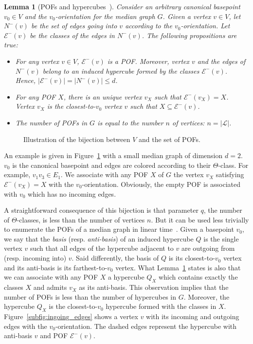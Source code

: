 \documentclass[11pt,letterpaper]{article}
\newtheorem{lemma}{Lemma}
\newcommand{\card}[1]{\left| #1 \right|}
\begin{document}
\begin{lemma}[POFs and hypercubes~\cite{BaChDrKo06,BaQuSaMa02,Ko09}]
Consider an arbitrary canonical basepoint $v_0 \in V$ and the $v_0$-orientation for the median graph $G$. Given a vertex $v \in V$, let $N^-(v)$ be the set of edges going into $v$ according to the $v_0$-orientation. Let $\mathcal{E}^-(v)$ be the classes of the edges in $N^-(v)$. The following propositions are true:
\begin{itemize}
\item For any vertex $v\in V$, $\mathcal{E}^-(v)$ is a POF. Moreover, vertex $v$ and the edges of $N^-(v)$ belong to an induced hypercube formed by the classes $\mathcal{E}^-(v)$. Hence, $\card{\mathcal{E}^-(v)} = \card{N^-(v)} \le d$.
\item For any POF $X$, there is an unique vertex $v_X$ such that $\mathcal{E}^-(v_X) = X$. Vertex $v_X$ is the closest-to-$v_0$ vertex $v$ such that $X \subseteq \mathcal{E}^-(v)$.
\item The number of POFs in $G$ is equal to the number $n$ of vertices: $n = \card{\mathcal{L}}$.
\end{itemize}
\label{le:pof_hypercube}
\end{lemma}

\begin{figure}[h]
\centering
\scalebox{0.95}{}
\caption{Illustration of the bijection between $V$ and the set of POFs.}
\label{fig:vertices_pof}
\end{figure}

An example is given in Figure~\ref{fig:vertices_pof} with a small median graph of dimension $d=2$. $v_0$ is the canonical basepoint  and edges are colored according to  their $\Theta$-class. For example, $v_1v_3 \in E_1$. We associate with any POF $X$ of $G$ the vertex $v_X$ satisfying $\mathcal{E}^-(v_X) = X$ with the $v_0$-orientation. Obviously, the empty POF is associated with $v_0$ which has no incoming edges.

A straightforward consequence of this bijection is that parameter $q$, the number of $\Theta$-classes, is less than the number of vertices $n$. But it can be used less trivially to enumerate the POFs of a median graph in linear time~\cite{BaQuSaMa02,Ko09}. Given a basepoint $v_0$, we say that the \textit{basis} (resp. \textit{anti-basis}) of an induced hypercube $Q$ is the single vertex $v$ such that all edges of the hypercube adjacent to $v$ are outgoing from (resp. incoming into) $v$. Said differently, the basis of $Q$ is its closest-to-$v_0$ vertex and its anti-basis is its farthest-to-$v_0$ vertex. What Lemma~\ref{le:pof_hypercube} states is also that we can associate with any POF $X$ a hypercube $Q_X$ which contains exactly the classes $X$ and admits $v_X$ as its anti-basis. This observation implies that the number of POFs is less than the number of hypercubes in $G$. Moreover, the hypercube $Q_X$ is the closest-to-$v_0$ hypercube formed with the classes in $X$. Figure~\ref{subfig:ingoing_edges} shows a vertex $v$ with its incoming and outgoing edges with the $v_0$-orientation. The dashed edges represent the hypercube with anti-basis $v$ and POF $\mathcal{E}^-(v)$.
\end{document}
